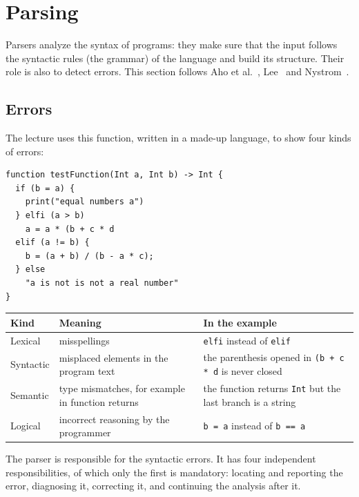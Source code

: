 \section{Parsing}
\label{sec:parsing}

Parsers analyze the syntax of programs: they make sure that the input follows
the syntactic rules (the grammar) of the language and build its structure.
Their role is also to detect errors. This section follows Aho et
al.~\cite[Ch.~4]{aho2007compilers}, Lee~\cite[Sec.~2.8--2.11]{lee2017foundations}
and Nystrom~\cite[Ch.~6--7]{nystrom2021crafting}.

\subsection{Errors}

The lecture uses this function, written in a made-up language, to show four
kinds of errors:
\begin{lstlisting}
function testFunction(Int a, Int b) -> Int {
  if (b = a) {
    print("equal numbers a")
  } elfi (a > b)
    a = a * (b + c * d
  elif (a != b) {
    b = (a + b) / (b - a * c);
  } else
    "a is not is not a real number"
}
\end{lstlisting}

\begin{center}
\small
\begin{tabular}{l p{} p{}}
  \toprule
  Kind & Meaning & In the example \\
  \midrule
  Lexical   & misspellings & \texttt{elfi} instead of \texttt{elif} \\
  Syntactic & misplaced elements in the program text & the parenthesis opened in \texttt{(b + c * d} is never closed \\
  Semantic  & type mismatches, for example in function returns & the function returns \texttt{Int} but the last branch is a string \\
  Logical   & incorrect reasoning by the programmer & \texttt{b = a} instead of \texttt{b == a} \\
  \bottomrule
\end{tabular}
\end{center}

The parser is responsible for the syntactic errors. It has four independent
responsibilities, of which only the first is mandatory: locating and
reporting the error, diagnosing it, correcting it, and continuing the
analysis after it.

